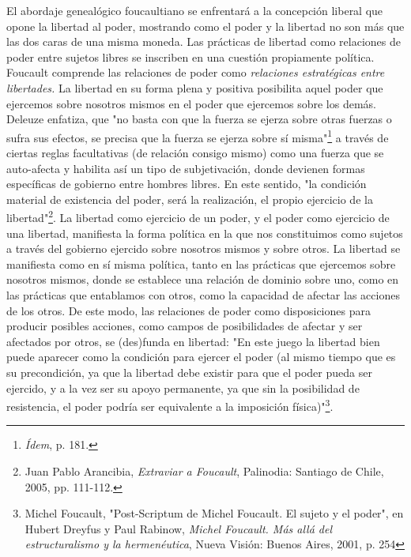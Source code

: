 \documentclass{book}
\begin{document}
El abordaje genealógico foucaultiano se enfrentará a la concepción
liberal que opone la libertad al poder, mostrando como el poder y la
libertad no son más que las dos caras de una misma moneda. Las prácticas
de libertad como relaciones de poder entre sujetos libres se inscriben
en una cuestión propiamente política. Foucault comprende las relaciones
de poder como \emph{relaciones estratégicas entre libertades.} La
libertad en su forma plena y positiva posibilita aquel poder que
ejercemos sobre nosotros mismos en el poder que ejercemos sobre los
demás. Deleuze enfatiza, que "no basta con que la fuerza se ejerza sobre
otras fuerzas o sufra sus efectos, se precisa que la fuerza se ejerza
sobre sí misma"\footnote{\emph{Ídem}, p. 181.} a través de ciertas
reglas facultativas (de relación consigo mismo) como una fuerza que se
auto-afecta y habilita así un tipo de subjetivación, donde devienen
formas específicas de gobierno entre hombres libres. En este sentido,
"la condición material de existencia del poder, será la realización, el
propio ejercicio de la libertad"\footnote{Juan Pablo Arancibia,
  \emph{Extraviar a Foucault}, Palinodia: Santiago de Chile, 2005, pp.
  111-112.}. La libertad como ejercicio de un poder, y el poder como
ejercicio de una libertad, manifiesta la forma política en la que nos
constituimos como sujetos a través del gobierno ejercido sobre nosotros
mismos y sobre otros. La libertad se manifiesta como en sí misma
política, tanto en las prácticas que ejercemos sobre nosotros mismos,
donde se establece una relación de dominio sobre uno, como en las
prácticas que entablamos con otros, como la capacidad de afectar las
acciones de los otros. De este modo, las relaciones de poder como
disposiciones para producir posibles acciones, como campos de
posibilidades de afectar y ser afectados por otros, se (des)funda en
libertad: "En este juego la libertad bien puede aparecer como la
condición para ejercer el poder (al mismo tiempo que es su precondición,
ya que la libertad debe existir para que el poder pueda ser ejercido, y
a la vez ser su apoyo permanente, ya que sin la posibilidad de
resistencia, el poder podría ser equivalente a la imposición
física)"\footnote{Michel Foucault, "Post-Scriptum de Michel Foucault. El
  sujeto y el poder", en Hubert Dreyfus y Paul Rabinow, \emph{Michel
  Foucault. Más allá del estructuralismo y la hermenéutica}, Nueva
  Visión: Buenos Aires, 2001, p. 254}.
\end{document}
